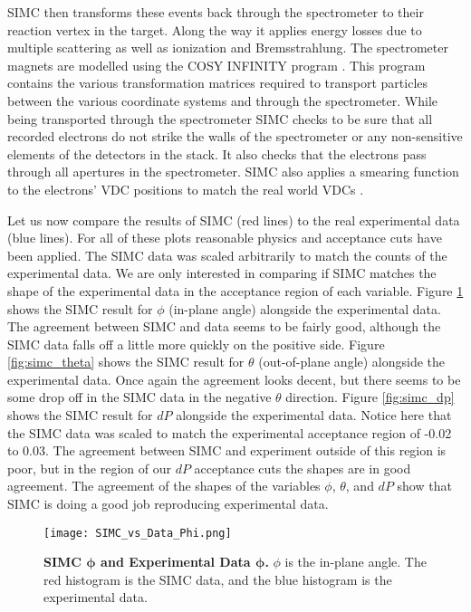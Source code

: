 SIMC then transforms these events back through the spectrometer to their reaction vertex in the target. Along the way it applies energy losses due to multiple scattering as well as ionization and Bremsstrahlung. The spectrometer magnets are modelled using the COSY INFINITY program \cite{cosy}. This program contains the various transformation matrices required to transport particles between the various coordinate systems and through the spectrometer. While being transported through the spectrometer SIMC checks to be sure that all recorded electrons do not strike the walls of the spectrometer or any non-sensitive elements of the detectors in the stack. It also checks that the electrons pass through all apertures in the spectrometer. SIMC also applies a smearing function to the electrons' VDC positions to match the real world VDCs \cite{Thesis:Wang}. 

Let us now compare the results of SIMC (red lines) to the real experimental data (blue lines). For all of these plots reasonable physics and acceptance cuts have been applied. The SIMC data was scaled arbitrarily to match the counts of the experimental data. We are only interested in comparing if SIMC matches the shape of the experimental data in the acceptance region of each variable. Figure \ref{fig:simc_phi} shows the SIMC result for $\phi$ (in-plane angle) alongside the experimental data. The agreement between SIMC and data seems to be fairly good, although the SIMC data falls off a little more quickly on the positive side. Figure \ref{fig:simc_theta} shows the SIMC result for $\theta$ (out-of-plane angle) alongside the experimental data. Once again the agreement looks decent, but there seems to be some drop off in the SIMC data in the negative $\theta$ direction. Figure \ref{fig:simc_dp} shows the SIMC result for $dP$ alongside the experimental data. Notice here that the SIMC data was scaled to match the experimental acceptance region of -0.02 to 0.03. The agreement between SIMC and experiment outside of this region is poor, but in the region of our $dP$ acceptance cuts the shapes are in good agreement. The agreement of the shapes of the variables $\phi$, $\theta$, and $dP$ show that SIMC is doing a good job reproducing experimental data.

\begin{figure}[!ht]
\begin{center}
\texttt{[image: SIMC\_vs\_Data\_Phi.png]}
\end{center}
\caption[SIMC $\phi$ and Experimental Data $\phi$]{
{\bf{SIMC $\boldsymbol{\phi}$ and Experimental Data $\boldsymbol{\phi}$.}} $\phi$ is the in-plane angle. The red histogram is the SIMC data, and the blue histogram is the experimental data.}
\label{fig:simc_phi}
\end{figure}

